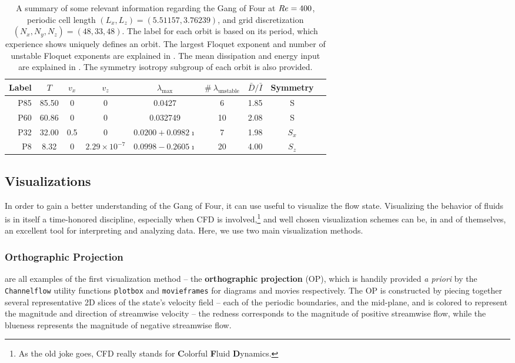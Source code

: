 \begin{table}[h!]
\caption{A summary of some relevant information regarding the Gang of Four at $Re = 400$, periodic cell length $(L_x,L_z) = (5.51157, 3.76239)$, and grid discretization $(N_x,N_y,N_z)= (48,33,48)$. The label for each orbit is based on its period, which experience shows uniquely defines an orbit. The largest Floquet exponent and number of unstable Floquet exponents are explained in . The mean dissipation and energy input are explained in . The symmetry isotropy subgroup of each orbit is also provided.}\label{tab:summary}
\begin{center}
\begin{tabular}{r   c  c  c  c  c  c  c  l }
\toprule
Label & $T$ & $v_x$ & $v_z$ &  $\lambda_{\textrm{max}}$ & $\#\ \lambda_{\textrm{unstable}}$ & $\bar{D}/\bar{I}$&  Symmetry \\
\midrule
\midrule
P85 & 85.50 & 0 & 0 & 0.0427 & 6 &1.85 & S\\
P60 & 60.86 & 0 & 0 &  0.032749 & 10 & 2.08 & S\\
P32 & 32.00 & 0.5 & 0 &  $0.0200 + 0.0982\imath$ & 7& 1.98 &$S_x$\\
P8 & 8.32 & 0 & $2.29\times 10^{-7}$ & $0.0998 - 0.2605 \imath$ &20& 4.00& $S_z$\\
\bottomrule
\end{tabular}
\end{center}
\end{table}

\subsection{Visualizations}   
In order to gain a better understanding of the Gang of Four, it can use useful to visualize the flow state. Visualizing the behavior of fluids is in itself a time-honored discipline, especially when CFD is involved,\footnote{As the old joke goes, CFD really stands for {\bf C}olorful {\bf F}luid {\bf D}ynamics.} and well chosen visualization schemes can be, in and of themselves, an excellent tool for interpreting and analyzing data. Here, we use two main visualization methods.
\subsubsection{Orthographic Projection}
 are all examples of the first visualization method -- the {\bf orthographic projection} (OP), which is handily provided \emph{a priori} by the {\tt Channelflow} utility functions {\tt plotbox} and {\tt movieframes} for diagrams and movies respectively. The OP is constructed by piecing together several representative 2D slices of the state's velocity field -- each of the periodic boundaries, and the mid-plane, and is colored to represent the magnitude and direction of streamwise velocity -- the redness corresponds to the magnitude of positive streamwise flow, while the blueness represents the magnitude of negative streamwise flow.\\

